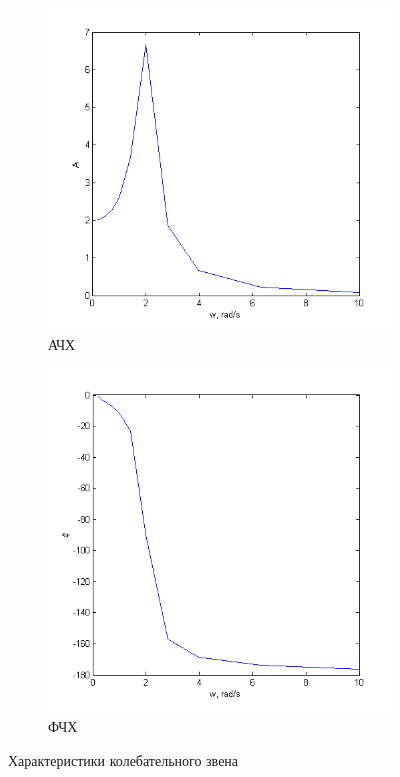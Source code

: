 \documentclass[a4paper, 11pt, russian]{article}
\begin{document}
\begin{figure}[ht!]
        \begin{subfigure}[h]{0.48\textwidth}
            \includegraphics[width = \textwidth]{oscillatoryLinkAFR}
            \caption{АЧХ}
        \end{subfigure}
        \hfill
        \begin{subfigure}[h]{0.48\textwidth}
            \includegraphics[width = \textwidth]{oscillatoryLinkPFR}
            \caption{ФЧХ}
        \end{subfigure}
        \caption{Характеристики колебательного звена}
    \end{figure}
\end{document}
